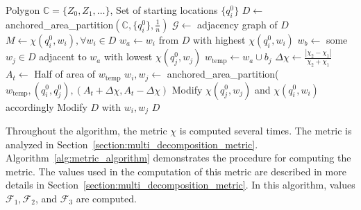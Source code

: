 \documentclass[../main.tex]{subfiles}
\begin{document}
\begin{algorithm}
	\caption{$\text{optimization\_procedure}(\mathbb{C}, \{q^0_i\})$}
	\label{alg:optimization_procedure}
	\begin{algorithmic}[1]
		\REQUIRE Polygon $\mathbb{C}=\{Z_0,Z_1,\ldots\}$, Set of starting locations $\{q^0_i\}$
			\STATE $D\gets$ anchored\_area\_partition$(\mathbb{C},\{q^0_i\},\frac{1}{n})$ \label{line:area_part}
			\STATE $\mathcal{G}\gets$ adjacency graph of $D$
			\STATE $M\gets\chi(q^0_i,w_i), \forall w_i\in D$ 
			\REPEAT
				\STATE $w_a\gets w_i$ from $D$ with highest $\chi(q^0_i,w_i)$
				\STATE $w_b\gets$ some $w_j\in D$ adjacent to $w_a$ with lowest $\chi(q^0_j,w_j)$
				\STATE $w_{\text{temp}}\gets w_a\cup b_j$
				\STATE $\Delta\chi\gets\frac{|\chi_2-\chi_1|}{\chi_2+\chi_1}$
				\STATE $A_t\gets$ Half of area of $w_{\text{temp}}$
				\STATE $w_i,w_j\gets$ anchored\_area\_partition($w_{\text{temp}},(q^0_i,q^0_j),(A_t+\Delta\chi,A_t-\Delta\chi)$\label{line:distr_opt_cut}
				\STATE Modify $\chi(q^0_j,w_j)$ and $\chi(q^0_i,w_i)$ accordingly
				\STATE Modify $D$ with $w_i,w_j$
			\RETURN $D$
	\end{algorithmic}
\end{algorithm}

Throughout the algorithm, the metric $\chi$ is computed several times. The metric is analyzed in Section~\ref{section:multi_decomposition_metric}. Algorithm~\ref{alg:metric_algorithm} demonstrates the procedure for computing the metric. The values used in the computation of this metric are described in more details in Section~\ref{section:multi_decomposition_metric}. In this algorithm, values $\mathcal{F}_1,\mathcal{F}_2$, and $\mathcal{F}_3$ are computed. 
\end{document}
